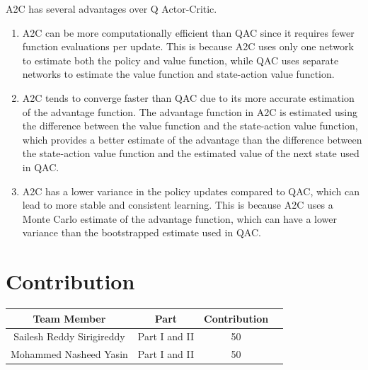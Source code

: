 \documentclass{article} %
\begin{document}
A2C has several advantages over Q Actor-Critic.

\begin{enumerate}
\item A2C can be more computationally efficient than QAC since it requires fewer function evaluations per update. This is because A2C uses only one network to estimate both the policy and value function, while QAC uses separate networks to estimate the value function and state-action value function.
\item A2C tends to converge faster than QAC due to its more accurate estimation of the advantage function. The advantage function in A2C is estimated using the difference between the value function and the state-action value function, which provides a better estimate of the advantage than the difference between the state-action value function and the estimated value of the next state used in QAC.
\item A2C has a lower variance in the policy updates compared to QAC, which can lead to more stable and consistent learning. This is because A2C uses a Monte Carlo estimate of the advantage function, which can have a lower variance than the bootstrapped estimate used in QAC.
\end{enumerate}

\section{Contribution}

\begin{center}
    \begin{tabular}{cccc}
        \toprule
        Team Member & Part & Contribution \\
        \midrule
        Sailesh Reddy Sirigireddy & Part I and II & 50 \\
        Mohammed Nasheed Yasin & Part I and II & 50 \\
        \bottomrule
    \end{tabular}
\end{center}

\printbibliography
\end{document}
